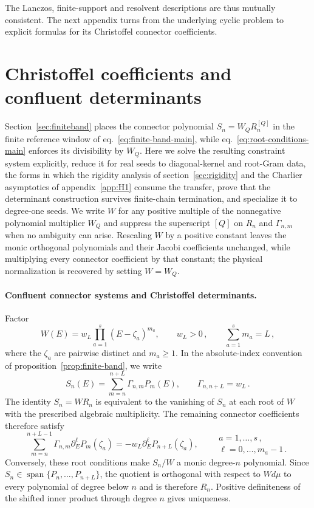\documentclass[a4paper,11pt]{article}
\def\dd{d}%
\theoremstyle{definition}
\theoremstyle{remark}
\newcommand{\dd}{\mathrm d}
\newcommand{\Span}{\operatorname{span}}
\begin{document}
The Lanczos, finite-support and resolvent descriptions are thus mutually consistent. The next appendix turns from the underlying cyclic problem to explicit formulas for its Christoffel connector coefficients.

\section{Christoffel coefficients and confluent determinants}
\label{app:christoffel}

Section~\ref{sec:finiteband} places the connector polynomial $S_n=W_QR_n^{[Q]}$ in the finite reference window of eq.~\eqref{eq:finite-band-main}, while eq.~\eqref{eq:root-conditions-main} enforces its divisibility by $W_Q$. %
Here we solve the resulting constraint system explicitly, reduce it for real seeds to
diagonal-kernel and root-Gram data, the forms in which the rigidity analysis of
section~\ref{sec:rigidity} and the Charlier asymptotics of appendix~\ref{app:H1} consume the
transfer, prove that the determinant construction survives finite-chain termination, and
specialize it to degree-one seeds. %
We write $W$ for any positive multiple of the nonnegative polynomial multiplier $W_Q$ and
suppress the superscript $[Q]$ on $R_n$ and $\Gamma_{n,m}$ when no ambiguity can arise. Rescaling
$W$ by a positive constant leaves the monic orthogonal polynomials and their Jacobi coefficients
unchanged, while multiplying every connector coefficient by that constant; the physical
normalization is recovered by setting $W=W_Q$.

\paragraph{Confluent connector systems and Christoffel determinants.}
Factor
\begin{equation}
   W(E)=w_L\prod_{a=1}^{s}(E-\zeta_a)^{m_a},
   \qquad
   w_L>0\,,
   \qquad
   \sum_{a=1}^{s}m_a=L\,,
\end{equation}
where the $\zeta_a$ are pairwise distinct and $m_a\ge1$. In the absolute-index convention of proposition~\ref{prop:finite-band}, we write
\begin{equation}
   S_n(E)=\sum_{m=n}^{n+L}\Gamma_{n,m}P_m(E),
   \qquad
   \Gamma_{n,n+L}=w_L\,.
\end{equation}
The identity $S_n=WR_n$ is equivalent to the vanishing of $S_n$ at each root of $W$ with the prescribed algebraic multiplicity. The remaining connector coefficients therefore satisfy
\begin{equation}
   \sum_{m=n}^{n+L-1}\Gamma_{n,m}
   \partial_E^\ell P_m(\zeta_a)
   =-w_L\partial_E^\ell P_{n+L}(\zeta_a),
   \qquad
   \substack{a=1,\ldots,s\,,\\[1pt] \ell=0,\ldots,m_a-1\,.}
   \label{eq:confluent-linear-system-app}
\end{equation}
Conversely, these root conditions make $S_n/W$ a monic degree-$n$ polynomial. Since $S_n\in\Span\{P_n,\ldots,P_{n+L}\}$, the quotient is orthogonal with respect to $W\dd\mu$ to every polynomial of degree below $n$ and is therefore $R_n$. Positive definiteness of the shifted inner product through degree $n$ gives uniqueness.
\end{document}
